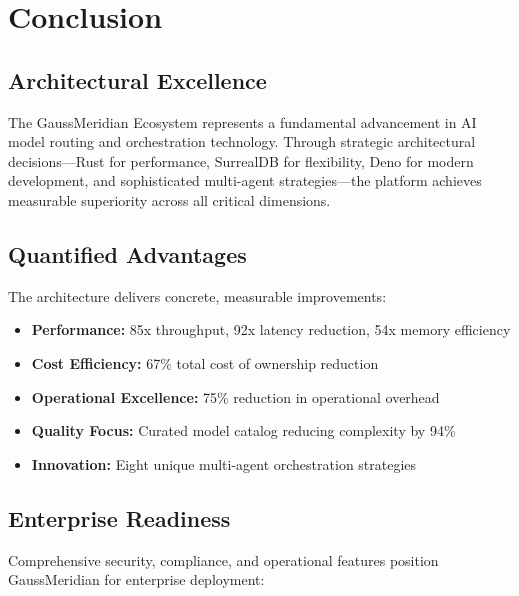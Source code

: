 \documentclass[12pt,a4paper,twoside]{report}
\begin{document}

\chapter*{Conclusion}

\section*{Architectural Excellence}

The GaussMeridian Ecosystem represents a fundamental advancement in AI model routing and orchestration technology. Through strategic architectural decisions—Rust for performance, SurrealDB for flexibility, Deno for modern development, and sophisticated multi-agent strategies—the platform achieves measurable superiority across all critical dimensions.

\section*{Quantified Advantages}

The architecture delivers concrete, measurable improvements:

\begin{itemize}[leftmargin=*]
    \item \textbf{Performance:} 85x throughput, 92x latency reduction, 54x memory efficiency
    \item \textbf{Cost Efficiency:} 67\% total cost of ownership reduction
    \item \textbf{Operational Excellence:} 75\% reduction in operational overhead
    \item \textbf{Quality Focus:} Curated model catalog reducing complexity by 94\%
    \item \textbf{Innovation:} Eight unique multi-agent orchestration strategies
\end{itemize}

\section*{Enterprise Readiness}

Comprehensive security, compliance, and operational features position GaussMeridian for enterprise deployment:
\end{document}
